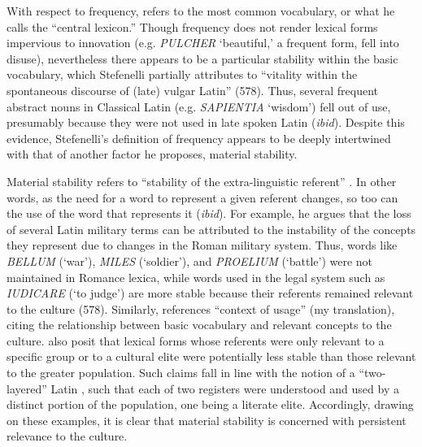 \documentclass[output=paper,colorlinks,citecolor=brown,
]{langscibook}
\begin{document}
With respect to frequency, \citet[569]{stefenelli_lexical_2011} refers to the most common vocabulary, or what he calls the “central lexicon.” Though frequency does not render lexical forms impervious to innovation (e.g. \textit{PULCHER} ‘beautiful,' a frequent form, fell into disuse), nevertheless there appears to be a particular stability within the basic vocabulary, which Stefenelli partially attributes to “vitality within the spontaneous discourse of (late) vulgar Latin” (578). Thus, several frequent abstract nouns in Classical Latin (e.g. \textit{SAPIENTIA} ‘wisdom’) fell out of use, presumably because they were not used in late spoken Latin (\textit{ibid}). Despite this evidence, Stefenelli's definition of frequency appears to be deeply intertwined with that of another factor he proposes, material stability.

Material stability refers to “stability of the extra-linguistic referent” \citet[578]{stefenelli_lexical_2011}. In other words, as the need for a word to represent a given referent changes, so too can the use of the word that represents it (\textit{ibid}). For example, he argues that the loss of several Latin military terms can be attributed to the instability of the concepts they represent due to changes in the Roman military system. Thus, words like \textit{BELLUM} (‘war’), \textit{MILES} (‘soldier’), and \textit{PROELIUM} (‘battle’) were not maintained in Romance lexica, while words used in the legal system such as \textit{IUDICARE} (‘to judge’) are more stable because their referents remained relevant to the culture (578). Similarly, \citet[228, 255]{glessgen_linguistique_2007} references “context of usage” (my translation), citing the relationship between basic vocabulary and relevant concepts to the culture. \citet[288]{alkire_romance_2010} also posit that lexical forms whose referents were only relevant to a specific group or to a cultural elite were potentially less stable than those relevant to the greater population. Such claims fall in line with the notion of a “two-layered” Latin \citep[65]{banniard_transition_2013}, such that each of two registers were understood and used by a distinct portion of the population, one being a literate elite. Accordingly, drawing on these examples, it is clear that material stability is concerned with persistent relevance to the culture.
\end{document}
